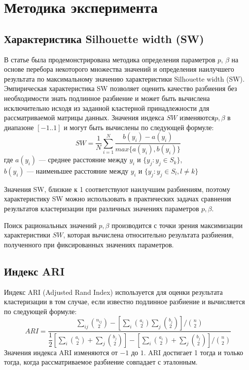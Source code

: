 \documentclass[12pt,twoside,a4paper,tikz,border=5]{refart}
\begin{document}
	\section{Методика эксперимента}
		\subsection{Характеристика Silhouette width (SW)}
			В статье \cite{choose-pb} была продемонстрирована методика определения параметров $ p $, $ \beta $ на основе перебора некоторого множества значений и определения наилучшего результата по максимальному значению характеристики Silhouette width (SW). Эмпирическая характеристика SW позволяет оценить качество разбиения без необходимости знать подлинное разбиение и может быть вычислена исключительно исходя из заданной кластерной принадлежности для рассматриваемой матрицы данных. Значения индекса $ SW $ изменяются$ p, \beta $ в диапазоне $ [-1..1] $ и могут быть вычислены по следующей формуле:
			\begin{equation}
				SW = \dfrac{1}{N}\sum_{i=1}^{N}\dfrac{b(y_i)-a(y_i)}{max\{a(y_i),b(y_i)\}}
			\end{equation}
			\noindent где $ a(y_i) $ --- среднее расстояние между $ y_i $ и $ \{y_j:y_j \in S_k\} $,\\
			\phantom{где\space}$b(y_i)$ --- наименьшее расстояние между $ y_i $ и $ \{y_j:y_j \in S_l, l\neq k \} $
			
			Значения  SW, близкие к 1 соответствуют наилучшим разбиениям, поэтому характеристику SW можно использовать в практических задачах сравнения результатов кластеризации при различных значениях параметров $ p,\beta $.
			
			Поиск рациональных значений $ p, \beta $ производится с точки зрения максимизации характеристики $ SW $, которая вычислена относительно результата разбиения, полученного при фиксированных значениях параметров.
		\subsection{Индекс ARI}
			Индекс ARI (Adjusted Rand Index) используется для оценки результата кластеризации в том случае, если известно подлинное разбиение \cite{ari} и вычисляется по следующей формуле:
			\begin{equation}
				ARI = \dfrac{\sum_{ij}\binom{n_{ij}}{2}-\left [ \sum_{i}\binom{a_{i}}{2}\sum_{j}\binom{b_{j}}{2} \right ]/\binom{n}{2}}{\dfrac{1}{2} \left [ \sum_i \binom{a_i}{2} + \sum_j \binom{b_j}{2} \right ] - \left [ \sum_i \binom{a_i}{2} + \sum_j \binom{b_j}{2} \right ]/ \binom{n}{2}}
			\end{equation} Значения индекса ARI изменяются от $ -1 $ до $ 1 $. ARI достигает 1 тогда и только тогда, когда рассматриваемое разбиение совпадает с эталонным.
\end{document}
